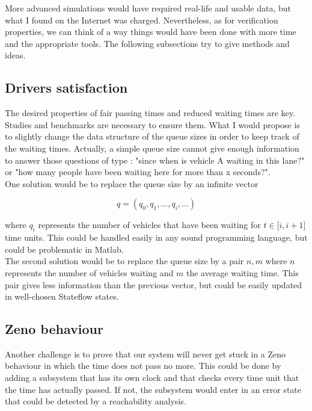 \documentclass[paper=a4, fontsize=11pt]{scrartcl}
\numberwithin{figure}{section}			%
\numberwithin{table}{section}				%
\begin{document}
More advanced simulations would have required real-life and usable data, but what I found on the Internet was charged. Nevertheless, as for verification properties, we can think of a way things would have been done with more time and the appropriate tools. The following subsections try to give methods and ideas.\\

\subsection{Drivers satisfaction}

The desired properties of fair passing times and reduced waiting times are key. Studies and benchmarks are necessary to ensure them. What I would propose is to slightly change the data structure of the queue sizes in order to keep track of the waiting times. Actually, a simple queue size cannot give enough information to answer those questions of type : "since when is vehicle A waiting in this lane?" or "how many people have been waiting here for more than x seconds?".\\

One solution would be to replace the queue size by an infinite vector

\[
q = (q_0, q_1, ..., q_i, ...)
\]

where \(q_i\) represents the number of vehicles that have been waiting for \(t \in \mathopen{[}i, i+1\mathclose{]}\) time units. This could be handled easily in any sound programming language, but could be problematic in Matlab.\\

The second solution would be to replace the queue size by a pair \(n, m\) where \(n\) represents the number of vehicles waiting and \(m\) the average waiting time. This pair gives less information than the previous vector, but could be easily updated in well-chosen Stateflow states.

\subsection{Zeno behaviour}

Another challenge is to prove that our system will never get stuck in a Zeno behaviour in which the time does not pass no more. This could be done by adding a subsystem that has its own clock and that checks every time unit that the time has actually passed. If not, the subsystem would enter in an error state that could be detected by a reachability analysis.
\end{document}
